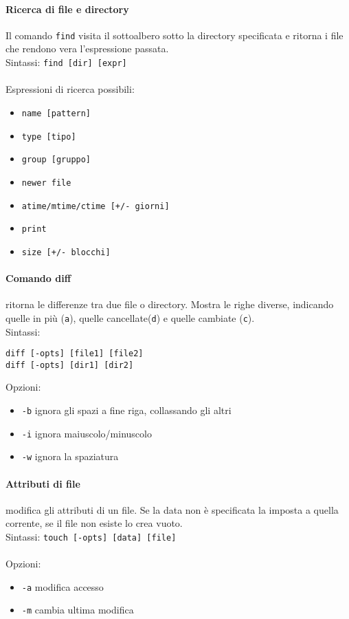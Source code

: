 \documentclass[a4paper, 10pt]{article}
\begin{document}
\paragraph{Ricerca di file e directory} Il comando \verb|find| visita il sottoalbero sotto la directory specificata e ritorna i file che rendono vera l'espressione passata. \\
Sintassi: \verb|find [dir] [expr]|\\ \\
Espressioni di ricerca possibili:
\begin{itemize}
\item \verb|name [pattern]|
\item \verb|type [tipo]|
\item \verb|group [gruppo]|
\item \verb|newer file|
\item \verb|atime/mtime/ctime [+/- giorni]|
\item \verb|print|
\item \verb|size [+/- blocchi]|
\end{itemize}

\paragraph{Comando diff} ritorna le differenze tra due file o directory. Mostra le righe diverse, indicando quelle in più (\verb|a|), quelle cancellate(\verb|d|) e quelle cambiate (\verb|c|).\\
Sintassi:
\begin{verbatim}
diff [-opts] [file1] [file2]
diff [-opts] [dir1] [dir2]
\end{verbatim}
Opzioni:
\begin{itemize}
\item \verb|-b| ignora gli spazi a fine riga, collassando gli altri
\item \verb|-i| ignora maiuscolo/minuscolo
\item \verb|-w| ignora la spaziatura
\end{itemize}

\paragraph{Attributi di file} modifica gli attributi di un file. Se la data non è specificata la imposta a quella corrente, se il file non esiste lo crea vuoto. \\
Sintassi:
\verb|touch [-opts] [data] [file]| \\ \\
Opzioni:
\begin{itemize}
\item \verb|-a| modifica accesso
\item \verb|-m| cambia ultima modifica
\end{itemize}
\end{document}
